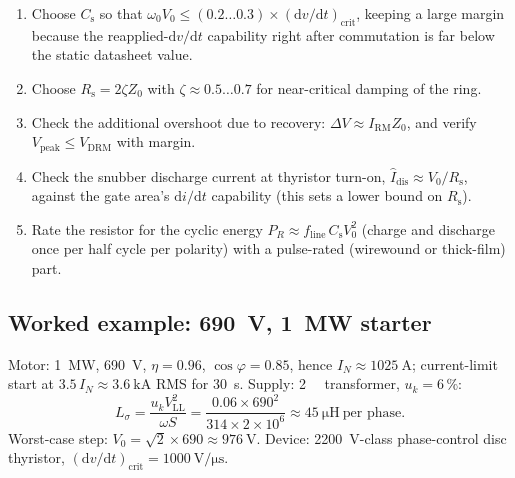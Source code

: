 \begin{enumerate}
  \item Choose $C_\mathrm{s}$ so that
        $\omega_0 V_0 \le (0.2\ldots0.3)\times
        (\mathrm{d}v/\mathrm{d}t)_\mathrm{crit}$,
        keeping a large margin because the reapplied-$\mathrm{d}v/\mathrm{d}t$
        capability right after commutation is far below the static datasheet
        value.
  \item Choose $R_\mathrm{s} = 2\zeta Z_0$ with $\zeta \approx 0.5\ldots0.7$
        for near-critical damping of the ring.
  \item Check the additional overshoot due to recovery:
        $\Delta V \approx I_\mathrm{RM} Z_0$, and verify
        $V_\mathrm{peak} \le V_\mathrm{DRM}$ with margin.
  \item Check the snubber discharge current at thyristor turn-on,
        $\hat{I}_\mathrm{dis} \approx V_0 / R_\mathrm{s}$, against the gate
        area's $\mathrm{d}i/\mathrm{d}t$ capability (this sets a lower bound
        on $R_\mathrm{s}$).
  \item Rate the resistor for the cyclic energy
        $P_{R} \approx f_\mathrm{line}\, C_\mathrm{s} V_0^2$
        (charge and discharge once per half cycle per polarity) with a
        pulse-rated (wirewound or thick-film) part.
\end{enumerate}

\subsection{Worked example: \SI{690}{\volt}, \SI{1}{\mega\watt} starter}

Motor: \SI{1}{\mega\watt}, \SI{690}{\volt}, $\eta = 0.96$,
$\cos\varphi = 0.85$, hence $I_N \approx \SI{1025}{\ampere}$; current-limit
start at $3.5\,I_N \approx \SI{3.6}{\kilo\ampere}$ RMS for
\SI{30}{\second}. Supply: \SI{2}{\mega\voltampere} transformer,
$u_k = 6\,\%$:
\begin{equation}
  L_\sigma = \frac{u_k V_\mathrm{LL}^2}{\omega S}
  = \frac{0.06 \times 690^2}{314 \times 2\times10^6}
  \approx \SI{45}{\micro\henry}\ \text{per phase}.
\end{equation}
Worst-case step: $V_0 = \sqrt{2}\times 690 \approx \SI{976}{\volt}$.
Device: \SI{2200}{\volt}-class phase-control disc thyristor,
$(\mathrm{d}v/\mathrm{d}t)_\mathrm{crit} = \SI{1000}{\volt\per\micro\second}$.

